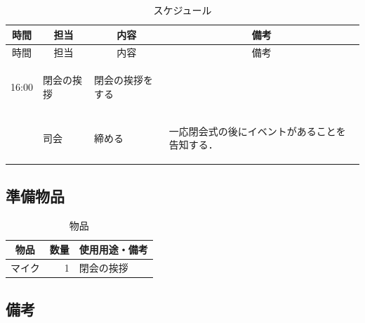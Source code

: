 \begin{longtable}[c]{|p{}|p{}|p{}|p{}|}
  \caption{スケジュール} \\
  \hline
  \multicolumn{1}{|c|}{時間} & \multicolumn{1}{c|}{担当} & \multicolumn{1}{c|}{内容} & \multicolumn{1}{c|}{備考} \\
  \hline
  \endfirsthead
  
  \hline
  \multicolumn{1}{|c|}{時間} & \multicolumn{1}{c|}{担当} & \multicolumn{1}{c|}{内容} & \multicolumn{1}{c|}{備考} \\
  \hline
  \endhead
  
  \hline
  \endfoot
  
  \hline
  \endlastfoot
  
  \begin{tpacol}
    16:00
  \end{tpacol}&
  \begin{tpbcol}
    閉会の挨拶
  \end{tpbcol}&
  \begin{tpccol}
    閉会の挨拶をする
  \end{tpccol}&
  \begin{tpdcol}
  \end{tpdcol}\\

  \begin{tpacol}

  \end{tpacol}&
  \begin{tpbcol}
    司会
  \end{tpbcol}&
  \begin{tpccol}
    締める
  \end{tpccol}&
  \begin{tpdcol}
    一応閉会式の後にイベントがあることを告知する．
  \end{tpdcol}\\
\end{longtable}
\normalsize

\subsection{準備物品}
\begin{table}[h]
  \centering
  \caption{物品}
  \begin{tabular}{lrl}
    \hline
    \multicolumn{1}{c}{物品} & \multicolumn{1}{c}{数量} & \multicolumn{1}{c}{使用用途・備考} \\
    \hline
    マイク & 1 & 閉会の挨拶 \\
    \hline  
  \end{tabular}
\end{table}

\subsection{備考}
